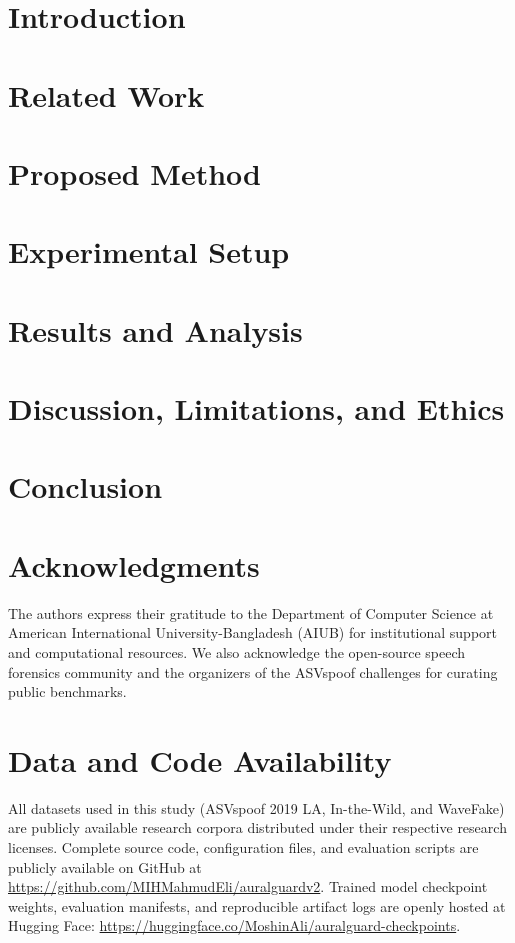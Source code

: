 \documentclass[journal]{IEEEtran}
\begin{document}
\section{Introduction}
\label{sec:intro}


\section{Related Work}
\label{sec:related}


\section{Proposed Method}
\label{sec:method}


\section{Experimental Setup}
\label{sec:setup}


\section{Results and Analysis}
\label{sec:results}


\section{Discussion, Limitations, and Ethics}
\label{sec:discussion}


\section{Conclusion}
\label{sec:conclusion}


\section*{Acknowledgments}
The authors express their gratitude to the Department of Computer Science at American International University-Bangladesh (AIUB) for institutional support and computational resources. We also acknowledge the open-source speech forensics community and the organizers of the ASVspoof challenges for curating public benchmarks.

\section*{Data and Code Availability}
All datasets used in this study (ASVspoof 2019 LA, In-the-Wild, and WaveFake) are publicly available research corpora distributed under their respective research licenses. Complete source code, configuration files, and evaluation scripts are publicly available on GitHub at \url{https://github.com/MIHMahmudEli/auralguardv2}. Trained model checkpoint weights, evaluation manifests, and reproducible artifact logs are openly hosted at Hugging Face: \url{https://huggingface.co/MoshinAli/auralguard-checkpoints}.
\end{document}
